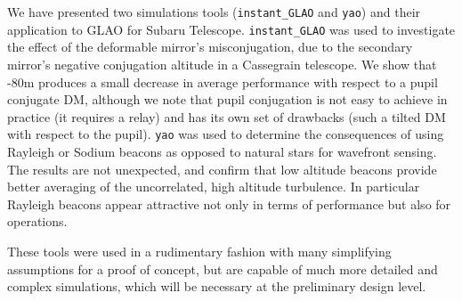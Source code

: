 \documentclass[aas_macros,10pt]{article}
\begin{document}
We have presented two simulations tools (\texttt{instant\_GLAO} and \texttt{yao}) and their application to GLAO for Subaru Telescope. \texttt{instant\_GLAO} was used to investigate the effect of the deformable mirror's misconjugation, due to the secondary mirror's negative conjugation altitude in a Cassegrain telescope. We show that -80m produces a small decrease in average performance with respect to a pupil conjugate DM, although we note that pupil conjugation is not easy to achieve in practice (it requires a relay) and has its own set of drawbacks (such a tilted DM with respect to the pupil). \texttt{yao} was used to determine the consequences of using Rayleigh or Sodium beacons as opposed to natural stars for wavefront sensing. The results are not unexpected, and confirm that low altitude beacons provide better averaging of the uncorrelated, high altitude turbulence. In particular Rayleigh beacons appear attractive not only in terms of performance but also for operations. 

These tools were used in a rudimentary fashion with many simplifying assumptions for a proof of concept, but are capable of much more detailed and complex simulations, which will be necessary at the preliminary design level. 





\end{document}
